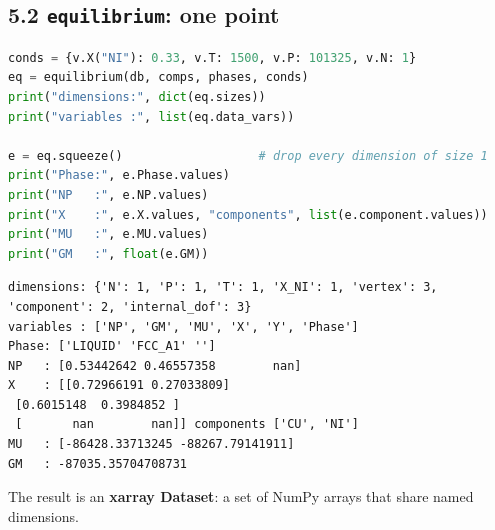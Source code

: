 \documentclass[12pt,a4paper]{article}
\begin{document}
\subsection*{5.2 \texttt{equilibrium}: one point}
\begin{lstlisting}[basicstyle={\footnotesize\ttfamily},language=Python]
conds = {v.X("NI"): 0.33, v.T: 1500, v.P: 101325, v.N: 1}
eq = equilibrium(db, comps, phases, conds)
print("dimensions:", dict(eq.sizes))
print("variables :", list(eq.data_vars))

e = eq.squeeze()                   # drop every dimension of size 1
print("Phase:", e.Phase.values)
print("NP   :", e.NP.values)
print("X    :", e.X.values, "components", list(e.component.values))
print("MU   :", e.MU.values)
print("GM   :", float(e.GM))
\end{lstlisting}
\begin{lstlisting}[basicstyle={\scriptsize\ttfamily}]
dimensions: {'N': 1, 'P': 1, 'T': 1, 'X_NI': 1, 'vertex': 3, 'component': 2, 'internal_dof': 3}
variables : ['NP', 'GM', 'MU', 'X', 'Y', 'Phase']
Phase: ['LIQUID' 'FCC_A1' '']
NP   : [0.53442642 0.46557358        nan]
X    : [[0.72966191 0.27033809]
 [0.6015148  0.3984852 ]
 [       nan        nan]] components ['CU', 'NI']
MU   : [-86428.33713245 -88267.79141911]
GM   : -87035.35704708731
\end{lstlisting}
The result is an \textbf{xarray Dataset}: a set of NumPy arrays that share named dimensions.
\end{document}

